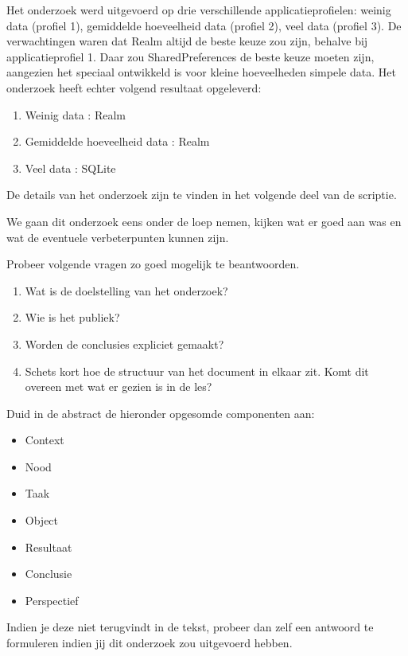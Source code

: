 \begin{displayquote}
  Het onderzoek werd uitgevoerd op drie verschillende applicatieprofielen: weinig data (profiel 1), gemiddelde hoeveelheid data (profiel 2), veel data (profiel 3). De verwachtingen waren dat Realm altijd de beste keuze zou zijn, behalve bij applicatieprofiel 1. Daar zou SharedPreferences de beste keuze moeten zijn, aangezien het speciaal ontwikkeld is voor kleine hoeveelheden simpele data. Het onderzoek heeft echter volgend resultaat opgeleverd:
  
  \begin{enumerate}
    \item Weinig data : Realm
    \item Gemiddelde hoeveelheid data : Realm
    \item Veel data : SQLite
  \end{enumerate}

  De details van het onderzoek zijn te vinden in het volgende deel van de scriptie.

\end{displayquote}

We gaan dit onderzoek eens onder de loep nemen, kijken wat er goed aan was en wat de eventuele verbeterpunten kunnen zijn. 

\begin{exercise}
  Probeer volgende vragen zo goed mogelijk te beantwoorden.
  \begin{enumerate}
    \item Wat is de doelstelling van het onderzoek?
    \item Wie is het publiek?
    \item Worden de conclusies expliciet gemaakt? 
    \item Schets kort hoe de structuur van het document in elkaar zit. Komt dit overeen met wat er gezien is in de les?
  \end{enumerate}
\end{exercise}

\begin{exercise}
  Duid in de abstract de hieronder opgesomde componenten aan:
  
  \begin{itemize}
    \item Context
    \item Nood
    \item Taak
    \item Object
    \item Resultaat
    \item Conclusie
    \item Perspectief
  \end{itemize}
  
  Indien je deze niet terugvindt in de tekst, probeer dan zelf een antwoord te formuleren indien jij dit onderzoek zou uitgevoerd hebben. 
\end{exercise}

